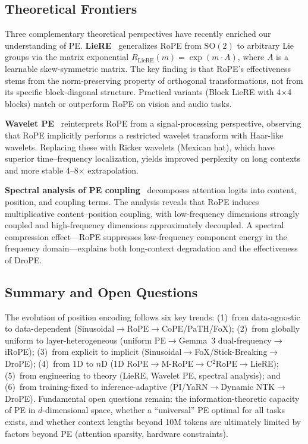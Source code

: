 \subsection{Theoretical Frontiers}
\label{subsec:pe_theory}

Three complementary theoretical perspectives have recently enriched our understanding of PE. \textbf{LieRE}~\cite{bermeitinger2024liere} generalizes RoPE from $\mathrm{SO}(2)$ to arbitrary Lie groups via the matrix exponential $R_{\mathrm{LieRE}}(m) = \exp(m\cdot A)$, where $A$ is a learnable skew-symmetric matrix. The key finding is that RoPE's effectiveness stems from the norm-preserving property of orthogonal transformations, not from its specific block-diagonal structure. Practical variants (Block LieRE with 4$\times$4 blocks) match or outperform RoPE on vision and audio tasks.

\textbf{Wavelet PE}~\cite{oka2025wavelet} reinterprets RoPE from a signal-processing perspective, observing that RoPE implicitly performs a restricted wavelet transform with Haar-like wavelets. Replacing these with Ricker wavelets (Mexican hat), which have superior time--frequency localization, yields improved perplexity on long contexts and more stable 4--8$\times$ extrapolation.

\textbf{Spectral analysis of PE coupling}~\cite{cheng2025spectral} decomposes attention logits into content, position, and coupling terms. The analysis reveals that RoPE induces multiplicative content--position coupling, with low-frequency dimensions strongly coupled and high-frequency dimensions approximately decoupled. A spectral compression effect---RoPE suppresses low-frequency component energy in the frequency domain---explains both long-context degradation and the effectiveness of DroPE.

\subsection{Summary and Open Questions}

The evolution of position encoding follows six key trends: (1)~from data-agnostic to data-dependent (Sinusoidal$\to$RoPE$\to$CoPE/PaTH/FoX); (2)~from globally uniform to layer-heterogeneous (uniform PE$\to$Gemma~3 dual-frequency$\to$iRoPE); (3)~from explicit to implicit (Sinusoidal$\to$FoX/Stick-Breaking$\to$DroPE); (4)~from 1D to $n$D (1D RoPE$\to$M-RoPE$\to$C$^2$RoPE$\to$LieRE); (5)~from engineering to theory (LieRE, Wavelet PE, spectral analysis); and (6)~from training-fixed to inference-adaptive (PI/YaRN$\to$Dynamic NTK$\to$DroPE). Fundamental open questions remain: the information-theoretic capacity of PE in $d$-dimensional space, whether a ``universal'' PE optimal for all tasks exists, and whether context lengths beyond 10M tokens are ultimately limited by factors beyond PE (attention sparsity, hardware constraints).
